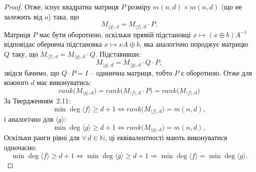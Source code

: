 \begin{proof}
    Отже, існує квадратна матриця $P$ розміру $m(n,d) \times m(n,d)$ (що не залежить
    від $a$) така, що
    \begin{equation*}
        M_{\langle g \rangle, d} = M_{\langle f \rangle, d} \cdot P.
    \end{equation*}
    Матриця $P$ має бути оборотною, оскільки прямій підстановці $x \mapsto (x \oplus b)A^{-1}$ відповідає обернена 
    підстановка $x \mapsto xA \oplus b$, яка аналогічно породжує матрицю $Q$ таку, що 
    $M_{\langle f \rangle, d} = M_{\langle g \rangle, d} \cdot Q$. Підставивши:
    \begin{equation*}
        M_{\langle g \rangle, d} = M_{\langle g \rangle, d} \cdot Q \cdot P,
    \end{equation*}
    звідси бачимо, що $Q \cdot P = I$ -- одинична матриця, тобто $P$ є оборотною. Отже для кожного $d$ має виконуватись:
    \begin{equation*}
        rank \big(M_{\langle g \rangle, d}\big) = rank \big(M_{\langle f \rangle, d} \cdot P\big)
        = rank \big(M_{\langle f \rangle, d}\big)
    \end{equation*}
    За Твердженням~2.11:
    \begin{equation*}
        \min \deg\langle f \rangle \geq d + 1 \Longleftrightarrow rank \big(M_{\langle f \rangle, d}\big) = m(n, d),
    \end{equation*}
    і аналогічно для $\langle g \rangle$:
        \begin{equation*}
        \min \deg\langle g \rangle \geq d + 1 \Longleftrightarrow rank \big(M_{\langle g \rangle, d}\big) = m(n, d),
    \end{equation*}
    Оскільки ранги рівні для $\forall\, d \in \mathbb{N}$, ці еквівалентності мають виконуватися одночасно:
    \begin{equation*}
        \min \deg\langle f \rangle \geq d + 1 \Leftrightarrow \min \deg\langle g \rangle \geq d + 1 
        \Rightarrow \min \deg\langle f \rangle = \min \deg\langle g \rangle.
    \end{equation*}
\end{proof}
